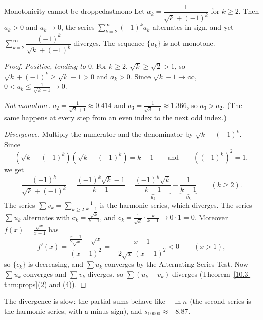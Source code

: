 \documentclass[11pt]{article}
\begin{document}
\begin{thm}{Monotonicity cannot be dropped}{astmono}
Let $a_k=\dfrac1{\sqrt k+(-1)^k}$ for $k\ge2$. Then $a_k>0$ and $a_k\to0$, the series $\sum_{k=2}^\infty(-1)^ka_k$ alternates in sign, and yet $\sum_{k=2}^\infty\dfrac{(-1)^k}{\sqrt k+(-1)^k}$ diverges. The sequence $\{a_k\}$ is not monotone.
\end{thm}
\begin{proof}
\emph{Positive, tending to $0$.} For $k\ge2$, $\sqrt k\ge\sqrt2>1$, so $\sqrt k+(-1)^k\ge\sqrt k-1>0$ and $a_k>0$. Since $\sqrt k-1\to\infty$, $0<a_k\le\frac1{\sqrt k-1}\to0$.

\emph{Not monotone.} $a_2=\frac1{\sqrt2+1}\approx0.414$ and $a_3=\frac1{\sqrt3-1}\approx1.366$, so $a_3>a_2$. (The same happens at every step from an even index to the next odd index.)

\emph{Divergence.} Multiply the numerator and the denominator by $\sqrt k-(-1)^k$. Since
\[
\left(\sqrt k+(-1)^k\right)\left(\sqrt k-(-1)^k\right)=k-1\qquad\text{and}\qquad\left((-1)^k\right)^2=1,
\]
we get
\[
\frac{(-1)^k}{\sqrt k+(-1)^k}=\frac{(-1)^k\sqrt k-1}{k-1}=\underbrace{\frac{(-1)^k\sqrt k}{k-1}}_{u_k}-\underbrace{\frac1{k-1}}_{v_k}\qquad(k\ge2).
\]
The series $\sum v_k=\sum_{k\ge2}\frac1{k-1}$ is the harmonic series, which diverges. The series $\sum u_k$ alternates with $c_k=\frac{\sqrt k}{k-1}$, and $c_k=\frac1{\sqrt k}\cdot\frac k{k-1}\to0\cdot1=0$. Moreover $f(x)=\frac{\sqrt x}{x-1}$ has
\[
f'(x)=\frac{\frac{x-1}{2\sqrt x}-\sqrt x}{(x-1)^2}=-\frac{x+1}{2\sqrt x\,(x-1)^2}<0\qquad(x>1),
\]
so $\{c_k\}$ is decreasing, and $\sum u_k$ converges by the Alternating Series Test. Now $\sum u_k$ converges and $\sum v_k$ diverges, so $\sum(u_k-v_k)$ diverges (Theorem~\ref{10.3-thm:props}(2) and (4)).
\end{proof}

The divergence is slow: the partial sums behave like $-\ln n$ (the second series is the harmonic series, with a minus sign), and $s_{10000}\approx-8.87$.
\end{document}
